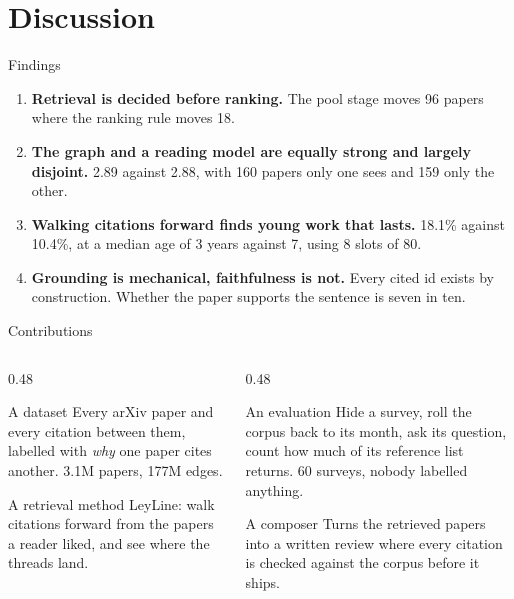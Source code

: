 \documentclass[aspectratio=169, 11pt]{beamer}
\let\oldtextbf\textbf
\renewcommand{\textbf}[1]{{\color{ktertiary}\oldtextbf{#1}}}
\let\oldemph\emph
\renewcommand{\emph}[1]{{\color{ksecondary}\oldemph{#1}}}
\begin{document}
\section{Discussion}

\begin{frame}{Findings}
  \begin{enumerate}
    \item \textbf{Retrieval is decided before ranking.} The pool stage moves 96 papers where
          the ranking rule moves 18.
    \item \textbf{The graph and a reading model are equally strong and largely disjoint.}
          2.89 against 2.88, with 160 papers only one sees and 159 only the other.
    \item \textbf{Walking citations forward finds young work that lasts.} 18.1\% against
          10.4\%, at a median age of 3 years against 7, using 8 slots of 80.
    \item \textbf{Grounding is mechanical, faithfulness is not.} Every cited id exists by
          construction. Whether the paper supports the sentence is seven in ten.
  \end{enumerate}
\end{frame}

\begin{frame}{Contributions}
  \begin{columns}[T]
    \begin{column}{0.48\textwidth}
      \begin{kbox}[equal height group=coA]{A dataset}
        Every arXiv paper and every citation between them, labelled with \emph{why} one paper
        cites another. 3.1M papers, 177M edges.
      \end{kbox}
      \begin{kbox}[equal height group=coB]{A retrieval method}
        LeyLine: walk citations forward from the papers a reader liked, and see where the
        threads land.
      \end{kbox}
    \end{column}
    \begin{column}{0.48\textwidth}
      \begin{kbox}[equal height group=coA]{An evaluation}
        Hide a survey, roll the corpus back to its month, ask its question, count how much of
        its reference list returns. 60 surveys, nobody labelled anything.
      \end{kbox}
      \begin{kbox}[equal height group=coB]{A composer}
        Turns the retrieved papers into a written review where every citation is checked against
        the corpus before it ships.
      \end{kbox}
    \end{column}
  \end{columns}
\end{frame}
\end{document}
